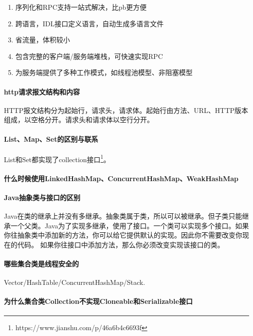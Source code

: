 \documentclass[../../../interview-questions.tex]{subfiles}
\begin{document}
\begin{enumerate}
\item {序列化和RPC支持一站式解决，比pb更方便}
\item{跨语言，IDL接口定义语言，自动生成多语言文件}
\item{省流量，体积较小}
\item{包含完整的客户端/服务端堆栈，可快速实现RPC}
\item{为服务端提供了多种工作模式，如线程池模型、非阻塞模型}
\end{enumerate}


\paragraph{http请求报文结构和内容}

HTTP报文结构分为起始行，请求头，请求体。起始行由方法、URL、HTTP版本组成，以空格分开。请求头和请求体以空行分开。


\paragraph{List、Map、Set的区别与联系}

List和Set都实现了collection接口\footnote{https://www.jianshu.com/p/46a6b4c6693f}。


\paragraph{什么时候使用LinkedHashMap、ConcurrentHashMap、WeakHashMap}

\paragraph{Java抽象类与接口的区别}

Java在类的继承上并没有多继承。抽象类属于类，所以可以被继承。但子类只能继承一个父类。Java为了实现多继承，使用了接口。一个类可以实现多个接口。如果你往抽象类中添加新的方法，你可以给它提供默认的实现。因此你不需要改变你现在的代码。 如果你往接口中添加方法，那么你必须改变实现该接口的类。

\paragraph{哪些集合类是线程安全的}

Vector/HashTable/ConcurrentHashMap/Stack.


\paragraph{为什么集合类Collection不实现Cloneable和Serializable接口}
\end{document}
